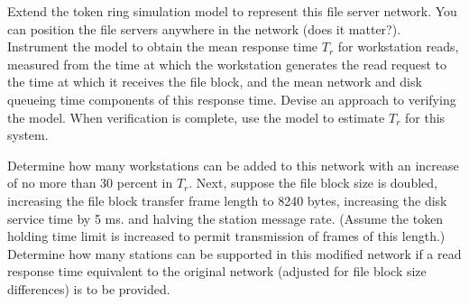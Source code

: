 Extend the token ring simulation model to represent this file server network. You can position the file servers anywhere in the network (does it matter?). Instrument the model to obtain the mean response time $T_r$ for workstation reads, measured from the time at which the workstation generates the read request to the time at which it receives the file block, and the mean network and disk queueing time components of this response time. Devise an approach to verifying the model. When verification is complete, use the model to estimate $T_r$ for this system.

Determine how many workstations can be added to this network with an increase of no more than 30 percent in $T_r$. Next, suppose the file block size is doubled, increasing the file block transfer frame length to 8240 bytes, increasing the disk service time by 5 ms. and halving the station message rate. (Assume the token holding time limit is increased to permit transmission of frames of this length.) Determine how many stations can be supported in this modified network if a read response time equivalent to the original network (adjusted for file block size differences) is to be provided.
